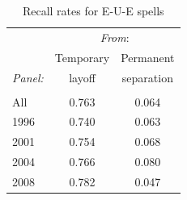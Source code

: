 \documentclass[12pt]{article}
\begin{document}

    \begin{table}
      \caption{Recall rates for E-U-E spells}
      \begin{center}
\begin{tabular}{l|cc}
  \hline \hline
   & \multicolumn{2}{c}{\textit{From}:} \\[0.35em]
                                     &\multicolumn{1}{c}{Temporary} & \multicolumn{1}{c}{Permanent} \\
   \textit{Panel:}                                  
                                     &\multicolumn{1}{c}{layoff} & 
                                     \multicolumn{1}{c}{separation} 
                                     \\[0.35em]
                                     \hline \\[-1em]
  All  & 0.763 & 0.064 \\[.35em]
  1996 & 0.740 & 0.063 \\[.35em]
  2001 & 0.754 & 0.068 \\[.35em]
  2004 & 0.766 & 0.080 \\[.35em]
  2008 & 0.782 & 0.047 \\[.35em]
               \hline
\end{tabular}
      \end{center}
    \end{table}
\end{document}
